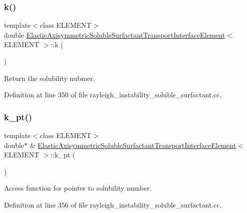 \subsubsection{\texorpdfstring{k()}{k()}}
{\footnotesize\ttfamily template$<$class E\+L\+E\+M\+E\+NT$>$ \\
double \hyperlink{classElasticAxisymmetricSolubleSurfactantTransportInterfaceElement}{Elastic\+Axisymmetric\+Soluble\+Surfactant\+Transport\+Interface\+Element}$<$ E\+L\+E\+M\+E\+NT $>$\+::k (\begin{DoxyParamCaption}{ }\end{DoxyParamCaption})\hspace{0.3cm}{\ttfamily [inline]}}



Return the solubility nubmer. 



Definition at line 350 of file rayleigh\+\_\+instability\+\_\+soluble\+\_\+surfactant.\+cc.

\mbox{\label{classElasticAxisymmetricSolubleSurfactantTransportInterfaceElement_a247b428c085e2d21385592af55b18539}} 
\subsubsection{\texorpdfstring{k\+\_\+pt()}{k\_pt()}}
{\footnotesize\ttfamily template$<$class E\+L\+E\+M\+E\+NT$>$ \\
double$\ast$ \& \hyperlink{classElasticAxisymmetricSolubleSurfactantTransportInterfaceElement}{Elastic\+Axisymmetric\+Soluble\+Surfactant\+Transport\+Interface\+Element}$<$ E\+L\+E\+M\+E\+NT $>$\+::k\+\_\+pt (\begin{DoxyParamCaption}{ }\end{DoxyParamCaption})\hspace{0.3cm}{\ttfamily [inline]}}



Access function for pointer to solubility number. 



Definition at line 356 of file rayleigh\+\_\+instability\+\_\+soluble\+\_\+surfactant.\+cc.



